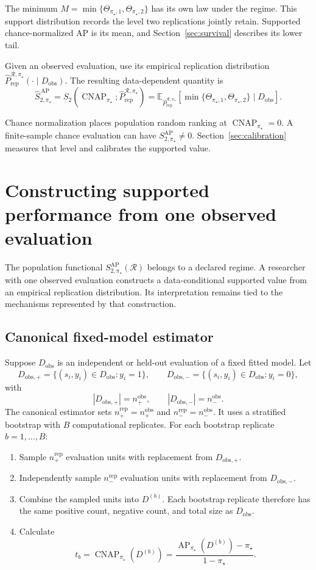 \documentclass[11pt]{article}
\newcommand{\AP}{\operatorname{AP}}
\newcommand{\CNAP}{\operatorname{CNAP}}
\newcommand{\Regime}{\mathcal{R}}
\newcommand{\Tpi}{\CNAP_{\pi_\star}}
\newcommand{\E}{\mathbb{E}}
\newcommand{\SAPfull}{S_{2,\pi_\star}^{\mathrm{AP}}(\Regime)}
\newcommand{\SAP}{S_{2,\pi_\star}^{\mathrm{AP}}}
\newcommand{\SAPHat}{\widehat S_{2,\pi_\star}^{\,\mathrm{AP}}}
\newcommand{\PRepHat}{\widehat{P}_{\mathrm{rep}}^{\Regime,\pi_\star}}
\theoremstyle{remark}
\begin{document}
The minimum $M=\min\{\Theta_{\pi_\star,1},\Theta_{\pi_\star,2}\}$ has its own law under the regime. This support distribution records the level two replications jointly retain. Supported chance-normalized AP is its mean, and Section~\ref{sec:survival} describes its lower tail.

Given an observed evaluation, use its empirical replication distribution $\PRepHat(\cdot\mid D_{\mathrm{obs}})$. The resulting data-dependent quantity is
\begin{equation}
\SAPHat
=
S_2(\CNAP_{\pi_\star};\PRepHat)
=
\E_{\PRepHat}
\left[
\min\{
\Theta_{\pi_\star,1},
\Theta_{\pi_\star,2}
\}
\mid D_{\mathrm{obs}}
\right].
\label{eq:rcap-estimated}
\end{equation}

Chance normalization places population random ranking at $\Tpi=0$. A finite-sample chance evaluation can have $\SAP\ne0$. Section~\ref{sec:calibration} measures that level and calibrates the supported value.

\section{Constructing supported performance from one observed evaluation}
\label{sec:estimation}

The population functional $\SAPfull$ belongs to a declared regime. A researcher with one observed evaluation constructs a data-conditional supported value from an empirical replication distribution. Its interpretation remains tied to the mechanisms represented by that construction.

\subsection{Canonical fixed-model estimator}

Suppose $D_{\mathrm{obs}}$ is an independent or held-out evaluation of a fixed fitted model. Let
\[
D_{\mathrm{obs},+}
=
\{(s_i,y_i)\in D_{\mathrm{obs}}:y_i=1\},
\qquad
D_{\mathrm{obs},-}
=
\{(s_i,y_i)\in D_{\mathrm{obs}}:y_i=0\},
\]
with
\[
|D_{\mathrm{obs},+}|=n_+^{\mathrm{obs}},
\qquad
|D_{\mathrm{obs},-}|=n_-^{\mathrm{obs}}.
\]
The canonical estimator sets $n_+^{\mathrm{rep}}=n_+^{\mathrm{obs}}$ and $n_-^{\mathrm{rep}}=n_-^{\mathrm{obs}}$. It uses a stratified bootstrap with $B$ computational replicates. For each bootstrap replicate $b=1,\ldots,B$:
\begin{enumerate}
\item Sample $n_+^{\mathrm{rep}}$ evaluation units with replacement from $D_{\mathrm{obs},+}$.
\item Independently sample $n_-^{\mathrm{rep}}$ evaluation units with replacement from $D_{\mathrm{obs},-}$.
\item Combine the sampled units into $D^{(b)}$. Each bootstrap replicate therefore has the same positive count, negative count, and total size as $D_{\mathrm{obs}}$.
\item Calculate
\[
t_b=\Tpi(D^{(b)})
=
\frac{\AP_{\pi_\star}(D^{(b)})-\pi_\star}{1-\pi_\star}.
\]
\end{enumerate}
\end{document}
